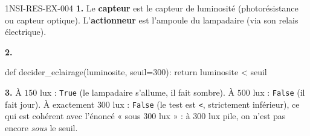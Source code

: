 \begin{corrige}{1NSI-RES-EX-004}
\textbf{1.} Le \textbf{capteur} est le capteur de luminosité (photorésistance ou capteur
optique). L'\textbf{actionneur} est l'ampoule du lampadaire (via son relais électrique).

\textbf{2.}
\begin{python}
def decider_eclairage(luminosite, seuil=300):
    return luminosite < seuil
\end{python}

\textbf{3.} À $150$ lux : \lstinline{True} (le lampadaire s'allume, il fait sombre). À
$500$ lux : \lstinline{False} (il fait jour). À exactement $300$ lux : \lstinline{False}
(le test est \lstinline{<}, strictement inférieur), ce qui est cohérent avec l'énoncé
« sous $300$ lux » : à $300$ lux pile, on n'est pas encore \textit{sous} le seuil.
\end{corrige}
